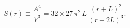 \begin{equation}
S(r)\equiv \frac{A^4}{V^3}=32 \times
27\,\pi^2\,L\,\frac{(r+L)^2}{(r+2L)^3}.
\end{equation}

